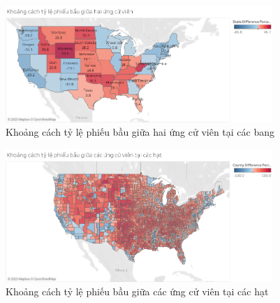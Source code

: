 \documentclass[14pt, a4paper]{article}
\numberwithin{equation}{section}
\numberwithin{figure}{section}
\numberwithin{dl}{section}
\numberwithin{md}{section}
\numberwithin{bd}{section}
\numberwithin{dn}{section}
\numberwithin{hq}{section}
\begin{document}
    \begin{figure}[h!]
        \centering
        \includegraphics[width=0.9\textwidth]{figures/State_Difference_Percentage_Total_Vote_Two_Candidate.png}
        \caption{Khoảng cách tỷ lệ phiếu bầu giữa hai ứng cử viên tại các bang}
    \end{figure}

    \begin{figure}[h!]
        \centering
        \includegraphics[width=0.9\textwidth]{figures/County_Difference_Percentage_Total_Vote_Two_Candidate.png}
        \caption{Khoảng cách tỷ lệ phiếu bầu giữa các ứng cử viên tại các hạt}
    \end{figure}
\end{document}
